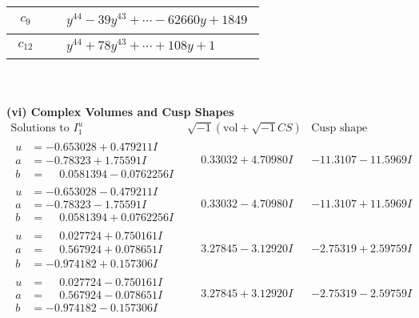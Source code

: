 \documentclass[1p]{elsarticle_modified}
\theoremstyle{definition}
\newcommand{\I}{\sqrt{-1}}
\begin{document}
\begin{tabular}{m{50pt}|m{274pt}}
\hline $$\begin{aligned}c_{9}\end{aligned}$$&$\begin{aligned}
&y^{44}-39 y^{43}+\cdots-62660 y+1849
\end{aligned}$\\
\hline $$\begin{aligned}c_{12}\end{aligned}$$&$\begin{aligned}
&y^{44}+78 y^{43}+\cdots+108 y+1
\end{aligned}$\\
\hline
\end{tabular}\\~\\
\newpage\flushleft \textbf{(vi) Complex Volumes and Cusp Shapes}
$$\begin{array}{c|c|c}  
\text{Solutions to }I^u_{1}& \I (\text{vol} + \sqrt{-1}CS) & \text{Cusp shape}\\
 \hline 
\begin{aligned}
u &= -0.653028 + 0.479211 I \\
a &= -0.78323 + 1.75591 I \\
b &= \phantom{-}0.0581394 - 0.0762256 I\end{aligned}
 & \phantom{-}0.33032 + 4.70980 I & -11.3107 - 11.5969 I \\ \hline\begin{aligned}
u &= -0.653028 - 0.479211 I \\
a &= -0.78323 - 1.75591 I \\
b &= \phantom{-}0.0581394 + 0.0762256 I\end{aligned}
 & \phantom{-}0.33032 - 4.70980 I & -11.3107 + 11.5969 I \\ \hline\begin{aligned}
u &= \phantom{-}0.027724 + 0.750161 I \\
a &= \phantom{-}0.567924 + 0.078651 I \\
b &= -0.974182 + 0.157306 I\end{aligned}
 & \phantom{-}3.27845 - 3.12920 I & -2.75319 + 2.59759 I \\ \hline\begin{aligned}
u &= \phantom{-}0.027724 - 0.750161 I \\
a &= \phantom{-}0.567924 - 0.078651 I \\
b &= -0.974182 - 0.157306 I\end{aligned}
 & \phantom{-}3.27845 + 3.12920 I & -2.75319 - 2.59759 I \\ \hline\begin{aligned}

\end{aligned}
\end{array}$$
\end{document}
